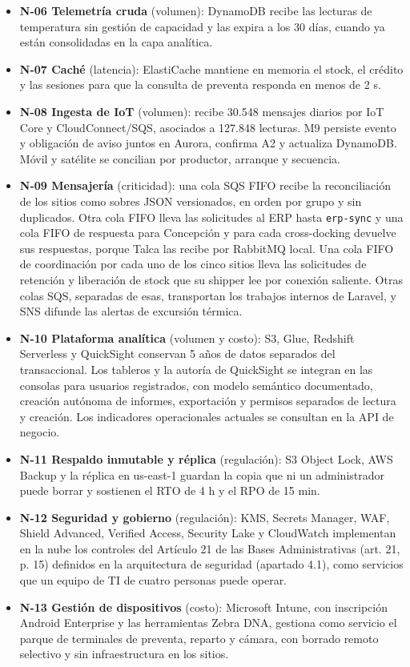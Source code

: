 \begin{itemize}
  \item \textbf{N-06 Telemetría cruda} (volumen): DynamoDB recibe las lecturas de temperatura sin gestión de capacidad y las expira a los 30 días, cuando ya están consolidadas en la capa analítica.
  \item \textbf{N-07 Caché} (latencia): ElastiCache mantiene en memoria el stock, el crédito y las sesiones para que la consulta de preventa responda en menos de 2 s.
  \item \textbf{N-08 Ingesta de IoT} (volumen): recibe 30.548 mensajes diarios por IoT Core y CloudConnect/SQS, asociados a 127.848 lecturas. M9 persiste evento y obligación de aviso juntos en Aurora, confirma A2 y actualiza DynamoDB. Móvil y satélite se concilian por productor, arranque y secuencia.
  \item \textbf{N-09 Mensajería} (criticidad): una cola SQS FIFO recibe la reconciliación de los sitios como sobres JSON versionados, en orden por grupo y sin duplicados. Otra cola FIFO lleva las solicitudes al ERP hasta \texttt{erp-sync} y una cola FIFO de respuesta para Concepción y para cada cross-docking devuelve sus respuestas, porque Talca las recibe por RabbitMQ local. Una cola FIFO de coordinación por cada uno de los cinco sitios lleva las solicitudes de retención y liberación de stock que su shipper lee por conexión saliente. Otras colas SQS, separadas de esas, transportan los trabajos internos de Laravel, y SNS difunde las alertas de excursión térmica.
  \item \textbf{N-10 Plataforma analítica} (volumen y costo): S3, Glue, Redshift Serverless y QuickSight conservan 5 años de datos separados del transaccional. Los tableros y la autoría de QuickSight se integran en las consolas para usuarios registrados, con modelo semántico documentado, creación autónoma de informes, exportación y permisos separados de lectura y creación. Los indicadores operacionales actuales se consultan en la API de negocio.
  \item \textbf{N-11 Respaldo inmutable y réplica} (regulación): S3 Object Lock, AWS Backup y la réplica en us-east-1 guardan la copia que ni un administrador puede borrar y sostienen el RTO de 4 h y el RPO de 15 min.
  \item \textbf{N-12 Seguridad y gobierno} (regulación): KMS, Secrets Manager, WAF, Shield Advanced, Verified Access, Security Lake y CloudWatch implementan en la nube los controles del Artículo 21 de las Bases Administrativas (art. 21, p. 15) definidos en la arquitectura de seguridad (apartado 4.1), como servicios que un equipo de TI de cuatro personas puede operar.
  \item \textbf{N-13 Gestión de dispositivos} (costo): Microsoft Intune, con inscripción Android Enterprise y las herramientas Zebra DNA, gestiona como servicio el parque de terminales de preventa, reparto y cámara, con borrado remoto selectivo y sin infraestructura en los sitios.
\end{itemize}

